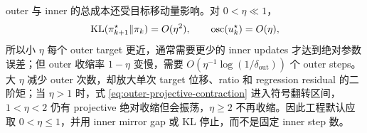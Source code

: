 outer 与 inner 的总成本还受目标移动量影响。对 $0<\eta\ll1$，\[
 \operatorname{KL}(\pi_{k+1}^{\star}\Vert\pi_k)=O(\eta^2),
 \qquad
 \operatorname{osc}(u_k^\star)=O(\eta),
\]
所以小 $\eta$ 每个 outer target 更近，通常需要更少的 inner updates 才达到绝对参数误差；但 outer 收缩率 $1-\eta$ 变慢，需要 $O(\eta^{-1}\log(1/\delta_{\mathrm{out}}))$ 个 outer steps。大 $\eta$ 减少 outer 次数，却放大单次 target 位移、ratio 和 regression residual 的二阶矩；当 $\eta>1$ 时，式 \eqref{eq:outer-projective-contraction} 进入符号翻转区间，$1<\eta<2$ 仍有 projective 绝对收缩但会振荡，$\eta\geq2$ 不再收缩。因此工程默认应取 $0<\eta\leq1$，并用 inner mirror gap 或 KL 停止，而不是固定 inner step 数。
